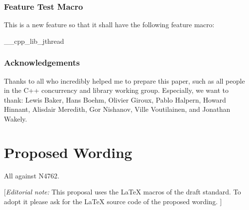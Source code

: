 \subsubsection*{Feature Test Macro}

This is a new feature so that it shall have the following feature macro:
\begin{codeblock}
	__cpp_lib_jthread
\end{codeblock}


\subsubsection*{Acknowledgements}

Thanks to all who incredibly helped me to prepare this paper, such as all people in the C++ concurrency and library working group.
Especially, we want to thank: Lewis Baker, Hans Boehm, Olivier Giroux, Pablo Halpern, Howard Hinnant, Alisdair Meredith, Gor Nishanov, Ville Voutilainen, and Jonathan Wakely.


\section*{Proposed Wording}
All against N4762.

{\color{blue}
[{\itshape{}Editorial note:} This proposal uses the LaTeX macros of the draft standard.
        To adopt it please ask for the LaTeX source code of the proposed wording. ]
}

\clearpage


